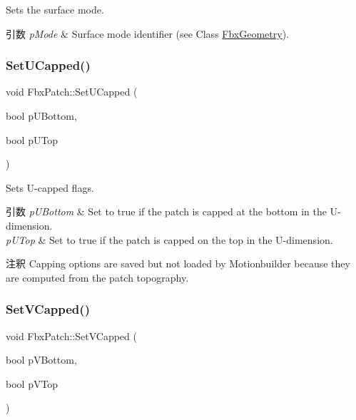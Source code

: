 Sets the surface mode. 
\begin{DoxyParams}{引数}
{\em p\+Mode} & Surface mode identifier (see Class \hyperlink{class_fbx_geometry}{Fbx\+Geometry}). \\
\hline
\end{DoxyParams}
\mbox{\label{class_fbx_patch_a9bd77e38cd9e41cf52638272fb240fdf}} 
\subsubsection{\texorpdfstring{Set\+U\+Capped()}{SetUCapped()}}
{\footnotesize\ttfamily void Fbx\+Patch\+::\+Set\+U\+Capped (\begin{DoxyParamCaption}\item[{bool}]{p\+U\+Bottom,  }\item[{bool}]{p\+U\+Top }\end{DoxyParamCaption})}

Sets U-\/capped flags. 
\begin{DoxyParams}{引数}
{\em p\+U\+Bottom} & Set to {\ttfamily true} if the patch is capped at the bottom in the U-\/dimension. \\
\hline
{\em p\+U\+Top} & {\ttfamily Set} to {\ttfamily true} if the patch is capped on the top in the U-\/dimension. \\
\hline
\end{DoxyParams}
\begin{DoxyRemark}{注釈}
Capping options are saved but not loaded by Motionbuilder because they are computed from the patch topography. 
\end{DoxyRemark}
\mbox{\label{class_fbx_patch_a11fa20b64650ce4312b5238e8fde6cb8}} 
\subsubsection{\texorpdfstring{Set\+V\+Capped()}{SetVCapped()}}
{\footnotesize\ttfamily void Fbx\+Patch\+::\+Set\+V\+Capped (\begin{DoxyParamCaption}\item[{bool}]{p\+V\+Bottom,  }\item[{bool}]{p\+V\+Top }\end{DoxyParamCaption})}

